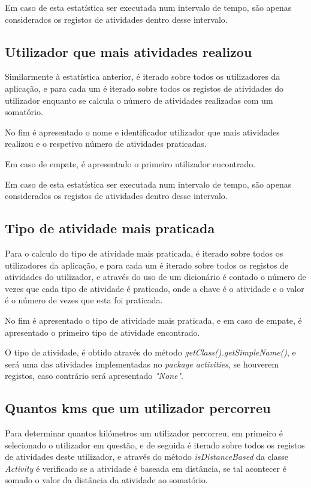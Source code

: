 \documentclass[a4paper,12pt]{scrreprt}
\begin{document}
        Em caso de esta estatística ser executada num intervalo de tempo,
        são apenas considerados os registos de atividades dentro desse intervalo.

    \subsection{Utilizador que mais atividades realizou}
        Similarmente à estatística anterior, é iterado sobre todos os utilizadores da aplicação,
        e para cada um é iterado sobre todos os registos de atividades do utilizador
        enquanto se calcula o número de atividades realizadas com um somatório.

        No fim é apresentado o nome e identificador utilizador que mais atividades realizou e
        o respetivo número de atividades praticadas.

        Em caso de empate, é apresentado o primeiro utilizador encontrado.

        Em caso de esta estatística ser executada num intervalo de tempo,
        são apenas considerados os registos de atividades dentro desse intervalo.

    \subsection{Tipo de atividade mais praticada}
        Para o calculo do tipo de atividade mais praticada, é iterado sobre todos os utilizadores da aplicação,
        e para cada um é iterado sobre todos os registos de atividades do utilizador,
        e através do uso de um dicionário é contado o número de vezes que cada tipo de atividade é praticado,
        onde a chave é o atividade e o valor é o número de vezes que esta foi praticada.

        No fim é apresentado o tipo de atividade mais praticada, e em caso de empate,
        é apresentado o primeiro tipo de atividade encontrado.

        O tipo de atividade, é obtido através do método \textit{getClass().getSimpleName()},
        e será uma das atividades implementadas no \textit{package activities}, se houverem registos,
        caso contrário será apresentado \textit{"None"}.

    \subsection{Quantos kms que um utilizador percorreu}
        Para determinar quantos kilómetros um utilizador percorreu, em primeiro é selecionado o utilizador em questão,
        e de seguida é iterado sobre todos os registos de atividades deste utilizador,
        e através do método \textit{isDistanceBased} da classe \textit{Activity} é verificado se a atividade é baseada em distância,
        se tal acontecer é somado o valor da distância da atividade ao somatório.
\end{document}
